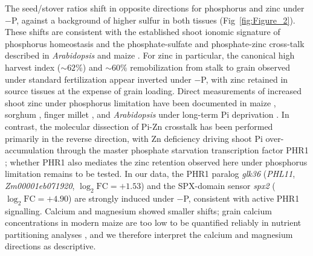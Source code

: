 \documentclass[9pt,twocolumn,twoside]{rilabRxiv}
\begin{document}
The seed/stover ratios shift in opposite directions for phosphorus and zinc under $-$P, against a background of higher sulfur in both tissues (Fig~\ref{fig:Figure_2}).
These shifts are consistent with the established shoot ionomic signature of phosphorus homeostasis \citep{baxter2008} and the phosphate-sulfate and phosphate-zinc cross-talk described in \textit{Arabidopsis} and maize \citep{bielecka2014,bouain2014,wangzou2023,roller2025}.
For zinc in particular, the canonical high harvest index ($\sim 62\%$) and $\sim 60\%$ remobilization from stalk to grain observed under standard fertilization \citep{bender2013} appear inverted under $-$P, with zinc retained in source tissues at the expense of grain loading.
Direct measurements of increased shoot zinc under phosphorus limitation have been documented in maize \citep{soltanghei2014,saenchai2016}, sorghum \citep{oseni2009}, finger millet \citep{maharajan2023}, and \textit{Arabidopsis} under long-term Pi deprivation \citep{misson2005}.
In contrast, the molecular dissection of Pi-Zn crosstalk has been performed primarily in the reverse direction, with Zn deficiency driving shoot Pi over-accumulation through the master phosphate starvation transcription factor PHR1 \citep{bouain2014,khan2014}; whether PHR1 also mediates the zinc retention observed here under phosphorus limitation remains to be tested.
In our data, the PHR1 paralog \textit{glk36} (\textit{PHL11}, \textit{Zm00001eb071920}, $\log_2{\text{FC}}=+1.53$) and the SPX-domain sensor \textit{spx2} ($\log_2{\text{FC}}=+4.90$) are strongly induced under $-$P, consistent with active PHR1 signalling.
Calcium and magnesium showed smaller shifts; grain calcium concentrations in modern maize are too low to be quantified reliably in nutrient partitioning analyses \citep{bender2013}, and we therefore interpret the calcium and magnesium directions as descriptive.
\end{document}
